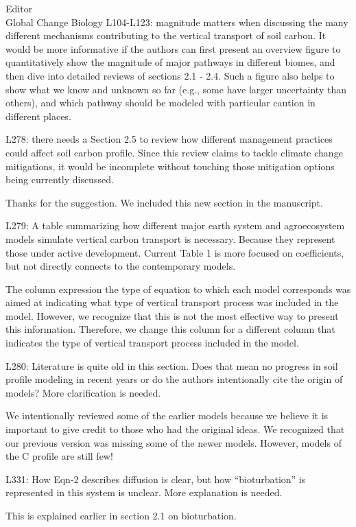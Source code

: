 \documentclass[11pt]{bgcletter}
\newcommand{\answer}[1] {
{\color{cyan} #1}
}
\begin{document}
\begin{letter}{Editor\\
   Global Change Biology
}
L104-L123: magnitude matters when discussing the many different mechanisms contributing to the vertical transport of soil carbon. It would be more informative if the authors can first present an overview figure to quantitatively show the magnitude of major pathways in different biomes, and then dive into detailed reviews of sections 2.1 - 2.4. Such a figure also helps to show what we know and unknown so far (e.g., some have larger uncertainty than others), and which pathway should be modeled with particular caution in different places.

L278: there needs a Section 2.5 to review how different management practices could affect soil carbon profile. Since this review claims to tackle climate change mitigations, it would be incomplete without touching those mitigation options being currently discussed.

\answer{Thanks for the suggestion. We included this new section in the manuscript. }

L279: A table summarizing how different major earth system and agroecosystem models simulate vertical carbon transport is necessary. Because they represent those under active development. Current Table 1 is more focused on coefficients, but not directly connects to the contemporary models.

\answer{The column expression the type of equation to which each model corresponds was aimed at indicating what type of vertical transport process was included in the model. However, we recognize that this is not the most effective way to present this information. Therefore, we change this column for a different column that indicates the type of vertical transport process included in the model.}

L280: Literature is quite old in this section. Does that mean no progress in soil profile modeling in recent years or do the authors intentionally cite the origin of models? More clarification is needed.

\answer{We intentionally reviewed some of the earlier models because we believe it is important to give credit to those who had the original ideas. We recognized that our previous version was missing some of the newer models. However, models of the C profile are still few!}

L331: How Eqn-2 describes diffusion is clear, but how ``bioturbation'' is represented in this system is unclear. More explanation is needed.

\answer{This is explained earlier in section 2.1 on bioturbation.}


\end{letter}
\end{document}
